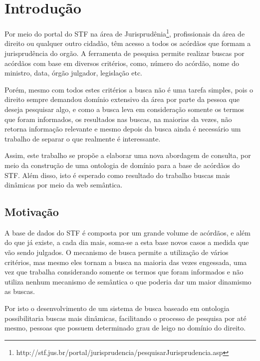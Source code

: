 \chapter{Introdução}
\label{cap:introducao}

Por meio do portal do STF na área de Jurisprudênia\footnote{http://stf.jus.br/portal/jurisprudencia/pesquisarJurisprudencia.asp}, 
profissionais da área de direito ou qualquer outro cidadão, têm acesso a todos 
os acórdãos que formam a jurisprudência do orgão. A ferramenta de pesquisa permite 
realizar buscas por acórdãos com base em diversos critérios, como, número do 
acórdão, nome do ministro, data, órgão julgador, legislação etc. 

Porém, mesmo com todos estes critérios a busca não é uma tarefa simples, pois 
o direito sempre demandou domínio extensivo da área por parte da pessoa que deseja 
pesquisar algo, e como a busca leva em consideração somente os termos que foram 
informados, os resultados nas buscas, na maiorias da vezes, não retorna 
informação relevante e mesmo depois da busca ainda é necessário um trabalho de 
separar o que realmente é interessante.

Assim, este trabalho se propõe a elaborar uma nova abordagem de consulta, por meio
da construção de uma ontologia de domínio para a base de acórdãos do STF. Além 
disso, isto é esperado como resultado do trabalho buscas mais dinâmicas por meio 
da web semântica.

\section{Motivação}
\label{sec:motivacao}

A base de dados do STF é composta por um grande volume de acórdãos, e além do que 
já existe, a cada dia mais, soma-se a esta base novos casos a medida que vão sendo
julgados. O mecanismo de busca permite a utilização de vários critérios, mas 
mesmo eles tornam a busca na maioria das vezes engessada, uma vez que trabalha 
considerando somente os termos que foram informados e não utiliza nenhum 
mecanismo de semântica o que poderia dar um maior dinamismo as buscas.

Por isto o desenvolvimento de um sistema de busca baseado em ontologia 
possibilitaria buscas mais dinâmicas, facilitando o processo de pesquisa por 
até mesmo, pessoas que possuem determinado grau de leigo no domínio do direito.

